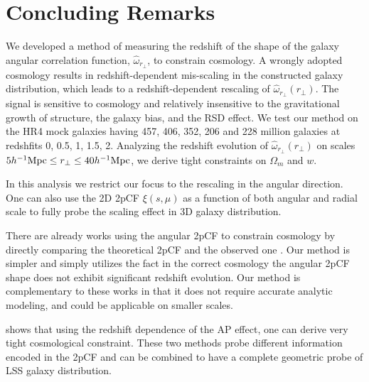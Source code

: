 \documentclass[iop]{emulateapj}
\begin{document}
\section{Concluding Remarks}
 
We developed a method of measuring the redshift of the shape of the galaxy angular correlation function, $\hat \omega_{r_\perp}$, to constrain cosmology.
A wrongly adopted cosmology results in redshift-dependent mis-scaling in the constructed galaxy distribution,
which leads to a redshift-dependent rescaling of $\hat \omega_{r_\perp}(r_\perp)$.
The signal is sensitive to cosmology and relatively insensitive to the gravitational growth of structure,
the galaxy bias, and the RSD effect.
We test our method on the HR4 mock galaxies having 457, 406, 352, 206 and 228 million galaxies at redshfits 0, 0.5, 1, 1.5, 2.
Analyzing the redshift evolution of $\hat \omega_{r_\perp}(r_\perp)$ 
on scales $5  h^{-1} {\rm Mpc} \leq r_\perp \leq 40 h^{-1} {\rm Mpc}$, 
we derive tight constraints on $\Omega_m$ and $w$.

 
In this analysis we restrict our focus to the rescaling in the angular direction.
One can also use the 2D 2pCF $\xi(s,\mu)$ 
as a function of both angular and radial scale to fully probe the scaling effect in 3D galaxy distribution.


There are already works using the angular 2pCF to constrain cosmology
by directly comparing the theoretical 2pCF and the observed one \citep{Salvador2014,Salvador2016}.
Our method is simpler and simply utilizes the fact in the correct cosmology the angular 2pCF shape
does not exhibit significant redshift evolution.
Our method is complementary to these works in that
it does not require accurate analytic modeling, 
and could be applicable on smaller scales.

 

\cite{Li2015,Li2016} shows that using the redshift dependence of the AP effect, 
one can derive very tight cosmological constraint.
These two methods probe different information encoded in the 2pCF 
and can be combined to have a complete geometric probe of LSS galaxy distribution.
\end{document}
